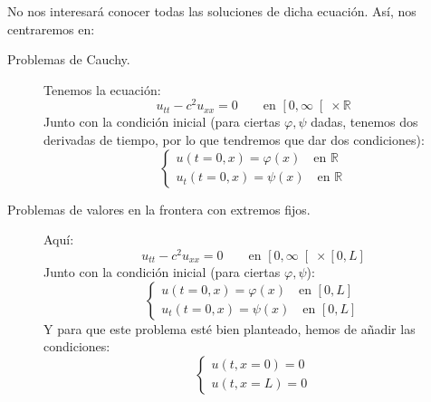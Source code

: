 \noindent
No nos interesará conocer todas las soluciones de dicha ecuación. Así, nos centraremos en:
\begin{description}
    \item [Problemas de Cauchy.] Tenemos la ecuación:
        \begin{equation*}
            u_{tt} - c^2 u_{xx} = 0 \qquad \text{en\ } \left[0,\infty\right[\times \mathbb{R}
        \end{equation*}
        Junto con la condición inicial (para ciertas $\varphi,\psi$ dadas, tenemos dos derivadas de tiempo, por lo que tendremos que dar dos condiciones):
        \begin{equation*}
            \left\{\begin{array}{l}
                u(t=0,x) = \varphi(x) \quad \text{en\ } \mathbb{R} \\
                u_t(t=0,x) = \psi(x) \quad \text{en\ } \mathbb{R}
            \end{array}\right.
        \end{equation*}
    \item [Problemas de valores en la frontera con extremos fijos.] Aquí:
        \begin{equation*}
            u_{tt} - c^2 u_{xx} = 0 \qquad \text{en\ } \left[0,\infty\right[\times [0,L]
        \end{equation*}
        Junto con la condición inicial (para ciertas $\varphi,\psi$):
        \begin{equation*}
            \left\{\begin{array}{l}
                u(t=0,x) = \varphi(x) \quad \text{en\ } [0,L] \\
                u_t(t=0,x) = \psi(x) \quad \text{en\ } [0,L]
            \end{array}\right.
        \end{equation*}
        Y para que este problema esté bien planteado, hemos de añadir las condiciones:
        \begin{equation*}
            \left\{\begin{array}{l}
                u(t,x=0) = 0 \\
                u(t,x=L) = 0 
            \end{array}\right.
        \end{equation*}
\end{description}

